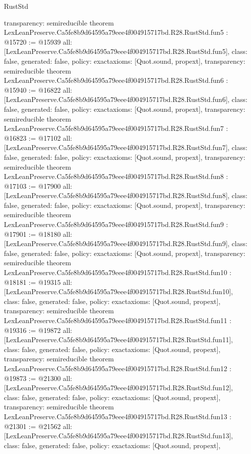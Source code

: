 \begin{lexlean}{RustStd}
\begin{coremodule}
{  transparency: semireducible
}
theorem LexLeanPreserve.Ca5fe8b9d64595a79eee4f004915717bd.R28.RustStd.fun5 : @15720 := @15939 {
  all: [LexLeanPreserve.Ca5fe8b9d64595a79eee4f004915717bd.R28.RustStd.fun5],
  class: false,
  generated: false,
  policy: exact{axioms: [Quot.sound, propext]},
  transparency: semireducible
}
theorem LexLeanPreserve.Ca5fe8b9d64595a79eee4f004915717bd.R28.RustStd.fun6 : @15940 := @16822 {
  all: [LexLeanPreserve.Ca5fe8b9d64595a79eee4f004915717bd.R28.RustStd.fun6],
  class: false,
  generated: false,
  policy: exact{axioms: [Quot.sound, propext]},
  transparency: semireducible
}
theorem LexLeanPreserve.Ca5fe8b9d64595a79eee4f004915717bd.R28.RustStd.fun7 : @16823 := @17102 {
  all: [LexLeanPreserve.Ca5fe8b9d64595a79eee4f004915717bd.R28.RustStd.fun7],
  class: false,
  generated: false,
  policy: exact{axioms: [Quot.sound, propext]},
  transparency: semireducible
}
theorem LexLeanPreserve.Ca5fe8b9d64595a79eee4f004915717bd.R28.RustStd.fun8 : @17103 := @17900 {
  all: [LexLeanPreserve.Ca5fe8b9d64595a79eee4f004915717bd.R28.RustStd.fun8],
  class: false,
  generated: false,
  policy: exact{axioms: [Quot.sound, propext]},
  transparency: semireducible
}
theorem LexLeanPreserve.Ca5fe8b9d64595a79eee4f004915717bd.R28.RustStd.fun9 : @17901 := @18180 {
  all: [LexLeanPreserve.Ca5fe8b9d64595a79eee4f004915717bd.R28.RustStd.fun9],
  class: false,
  generated: false,
  policy: exact{axioms: [Quot.sound, propext]},
  transparency: semireducible
}
theorem LexLeanPreserve.Ca5fe8b9d64595a79eee4f004915717bd.R28.RustStd.fun10 : @18181 := @19315 {
  all: [LexLeanPreserve.Ca5fe8b9d64595a79eee4f004915717bd.R28.RustStd.fun10],
  class: false,
  generated: false,
  policy: exact{axioms: [Quot.sound, propext]},
  transparency: semireducible
}
theorem LexLeanPreserve.Ca5fe8b9d64595a79eee4f004915717bd.R28.RustStd.fun11 : @19316 := @19872 {
  all: [LexLeanPreserve.Ca5fe8b9d64595a79eee4f004915717bd.R28.RustStd.fun11],
  class: false,
  generated: false,
  policy: exact{axioms: [Quot.sound, propext]},
  transparency: semireducible
}
theorem LexLeanPreserve.Ca5fe8b9d64595a79eee4f004915717bd.R28.RustStd.fun12 : @19873 := @21300 {
  all: [LexLeanPreserve.Ca5fe8b9d64595a79eee4f004915717bd.R28.RustStd.fun12],
  class: false,
  generated: false,
  policy: exact{axioms: [Quot.sound, propext]},
  transparency: semireducible
}
theorem LexLeanPreserve.Ca5fe8b9d64595a79eee4f004915717bd.R28.RustStd.fun13 : @21301 := @21562 {
  all: [LexLeanPreserve.Ca5fe8b9d64595a79eee4f004915717bd.R28.RustStd.fun13],
  class: false,
  generated: false,
  policy: exact{axioms: [Quot.sound, propext]},
}
\end{coremodule}
\end{lexlean}
